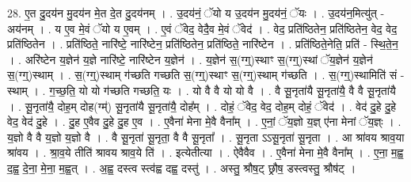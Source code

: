 \documentclass[17pt]{extarticle}
\begin{document}
28. ए॒त दु॒दय॑न मु॒दय॑न मे॒त दे॒त दु॒दय॑नम् । . उ॒दय॑नं॒ ॅयो य उ॒दय॑न मु॒दय॑नं॒ ॅयः । . उ॒दय॑न॒मित्यु॑त् - अय॑नम् । . य ए॒व मे॒वं ॅयो य ए॒वम् । . ए॒वं ॅवेद॒ वेदै॒व मे॒वं ॅवेद॑ । . वेद॒ प्रति॑ष्ठितेन॒ प्रति॑ष्ठितेन॒ वेद॒ वेद॒ प्रति॑ष्ठितेन । . प्रति॑ष्ठिते॒ नारि॑ष्टे॒ नारि॑ष्टेन॒ प्रति॑ष्ठितेन॒ प्रति॑ष्ठिते॒ नारि॑ष्टेन । . प्रति॑ष्ठिते॒नेति॒ प्रति॑ - स्थि॒ते॒न॒ । . अरि॑ष्टेन य॒ज्ञेन॑ य॒ज्ञे नारि॑ष्टे॒ नारि॑ष्टेन य॒ज्ञेन॑ । . य॒ज्ञेन॑ स॒(ग्ग्॒)स्थाꣳ स॒(ग्ग्॒)स्थां ॅय॒ज्ञेन॑ य॒ज्ञेन॑ स॒(ग्ग्॒)स्थाम् । . स॒(ग्ग्॒)स्थाम् ग॑च्छति गच्छति स॒(ग्ग्॒)स्थाꣳ स॒(ग्ग्॒)स्थाम् ग॑च्छति । . स॒(ग्ग्॒)स्थामिति॑ सं - स्थाम् । . ग॒च्छ॒ति॒ यो यो ग॑च्छति गच्छति॒ यः । . यो वै वै यो यो वै । . वै सू॒नृता॑यै सू॒नृता॑यै॒ वै वै सू॒नृता॑यै । . सू॒नृता॑यै॒ दोह॒म् दोह(ग्म्॑) सू॒नृता॑यै सू॒नृता॑यै॒ दोह᳚म् । . दोहं॒ ॅवेद॒ वेद॒ दोह॒म् दोहं॒ ॅवेद॑ । . वेद॑ दु॒हे दु॒हे वेद॒ वेद॑ दु॒हे । . दु॒ह ए॒वैव दु॒हे दु॒ह ए॒व । . ए॒वैना॑ मेना मे॒वै वैना᳚म् । . ए॒नां॒ ॅय॒ज्ञो य॒ज्ञ् ए॑ना मेनां ॅय॒ज्ञ्ः । . य॒ज्ञो वै वै य॒ज्ञो य॒ज्ञो वै । . वै सू॒नृता॑ सू॒नृता॒ वै वै सू॒नृता᳚ । . सू॒नृता ऽऽसू॒नृता॑ सू॒नृता । . आ श्रा॑वय श्राव॒या श्रा॑वय । . श्रा॒व॒ये तीति॑ श्रावय श्राव॒ये ति॑ । . इत्येतीत्या । . ऐवैवैव । . ए॒वैना॑ मेना मे॒वै वैना᳚म् । . ए॒ना॒ म॒ह्व॒ द॒ह्व॒ दे॒ना॒ मे॒ना॒ म॒ह्व॒त् । . अ॒ह्व॒ दस्त्व स्त्व॑ह्व दह्व॒ दस्तु॑ । . अस्तु॒ श्रौष॒ट् छ्रौष॒ डस्त्वस्तु॒ श्रौष॑ट् । \newline
\end{document}
